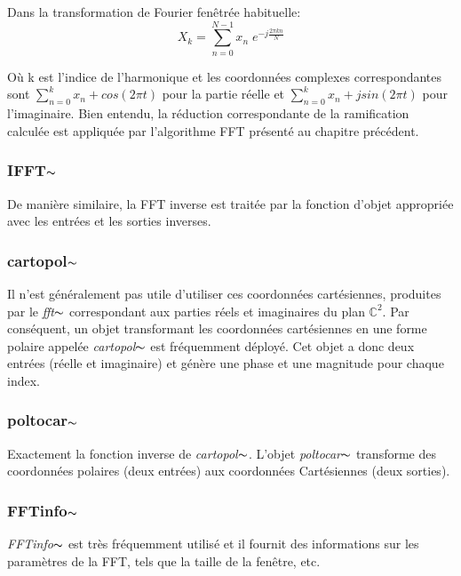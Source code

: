    Dans la transformation de Fourier fenêtrée habituelle:
    \begin{equation}
        X_k = \sum_{n=0}^{N-1} x_n \; e^{-j \frac{2 \pi k n}{N}}
    \end{equation}

    Où k est l’indice de l'harmonique et les coordonnées complexes correspondantes sont $ \sum_{n = 0}^k x_n + cos (2 \pi t) $ pour la partie réelle et $ \sum_{n = 0}^k x_n + j sin (2 \pi t) $ pour l’imaginaire. Bien entendu, la réduction correspondante de la ramification calculée est appliquée par l’algorithme FFT présenté au chapitre précédent.

\subsubsection{IFFT$\thicksim$}
    
    De manière similaire, la FFT inverse est traitée par la fonction d'objet appropriée avec les entrées et les sorties inverses.

\subsubsection{cartopol$\thicksim$}
    
    Il n’est généralement pas utile d’utiliser ces coordonnées cartésiennes, produites par le \textit{fft}$\thicksim $ correspondant aux parties réels et imaginaires du plan $ \mathbb {C}^2 $. Par conséquent, un objet transformant les coordonnées cartésiennes en une forme polaire appelée \textit{cartopol}$\thicksim $ est fréquemment déployé. Cet objet a donc deux entrées (réelle et imaginaire) et génère une phase et une magnitude pour chaque index.

\subsubsection{poltocar$\thicksim$}
    
    Exactement la fonction inverse de \textit{cartopol}$\thicksim $. L’objet \textit{poltocar}$\thicksim $ transforme des coordonnées polaires (deux entrées) aux coordonnées Cartésiennes (deux sorties).

\subsubsection{FFTinfo$\thicksim$}
    
    \textit{FFTinfo}$\thicksim $ est très fréquemment utilisé et il fournit des informations sur les paramètres de la FFT, tels que la taille de la fenêtre, etc.

